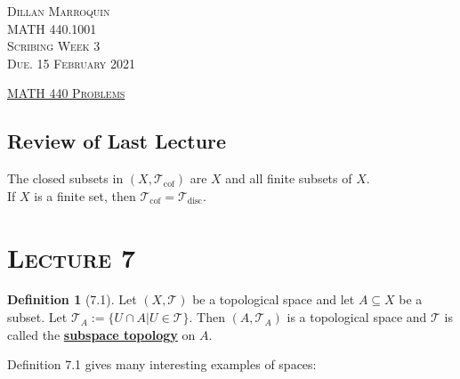 \documentclass{article}
\newcommand{\R}{\ensuremath{\mathbb{R}}}
\newcommand{\fRR}{\ensuremath{f:\R \to \R}}
\newcommand{\define}[1]{\textbf{\underline{#1}}}
\newcommand{\tp}{\ensuremath{\mathcal{T}}}
\newcommand{\tpcof}{\ensuremath{\tp_\text{cof}}}
\newcommand{\tpdisc}{\ensuremath{\tp_\text{disc}}}
\newcommand{\inter}{\cap}
\renewcommand{\Subset}{\subseteq}
\theoremstyle{definition}
\newtheorem*{definition}{Definition}
\theoremstyle{remark}
\begin{document}
    \begin{center}
        \textsc{Dillan Marroquin\\MATH 440.1001\\Scribing Week 3\\Due. 15 February 2021\\}
    \end{center}
    \begin{center}
        \underline{\textsc{MATH 440 Problems}}
    \end{center}
    
    \subsection*{Review of Last Lecture}
        The closed subsets in $(X, \tpcof)$ are $X$ and all finite subsets of $X$.\\
        If $X$ is a finite set, then $\tpcof = \tpdisc$.
    \noindent\section*{\textbf{\textsc{Lecture 7}}}
        \begin{definition}[7.1]
        Let $(X,\tp)$ be a topological space and let $A \Subset X$ be a subset. Let $\tp_A := \{U \inter A | U \in \tp\}$. Then $(A, \tp_A)$ is a topological space and $\tp$ is called the \define{subspace topology} on $A$.
        \end{definition}
        
        \noindent Definition 7.1 gives many interesting examples of spaces:
        
\end{document}
